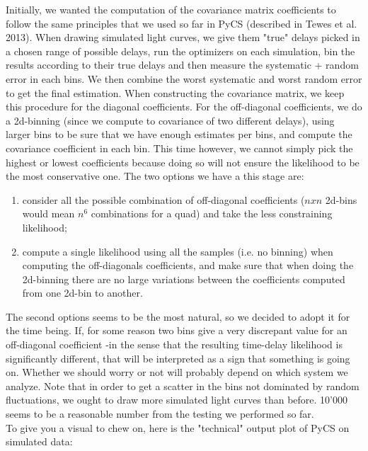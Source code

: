 \documentclass[11pt]{scrartcl}
\begin{document}
Initially, we wanted the computation of the covariance matrix 
coefficients to follow the same 
principles that we used so far in PyCS (described in Tewes et al. 
2013). When drawing simulated light curves, we give them "true" delays 
picked in a chosen range of possible delays, run the optimizers on each 
simulation, bin the results according to their true delays and then 
measure the systematic + random error in each bins. We then combine the 
worst systematic and worst random error to get the final estimation. 
When constructing the covariance matrix, we keep this procedure for the 
diagonal 
coefficients. For the off-diagonal coefficients, we do a 2d-binning 
(since we compute to covariance of two different delays), using larger 
bins to be 
sure that we have enough estimates per bins, and compute the covariance 
coefficient in each bin. This time however, we cannot simply pick the 
highest or lowest coefficients because 
doing so will not ensure the likelihood to be the most conservative 
one. The two options we have a this stage are:

\begin{enumerate}
\item consider all the possible combination of off-diagonal 
coefficients ($nxn$ 2d-bins would mean $n^6$ combinations for a quad) 
and take the less constraining likelihood; 

\item compute a single likelihood using all the samples (i.e. no 
binning) when computing the off-diagonals coefficients, and make sure 
that when doing the 2d-binning there are no large variations between the 
coefficients computed from one 2d-bin to another. 
\end{enumerate}

The second options seems to be the most natural, so we decided to adopt 
it for the time being. If, for some reason two bins give a very 
discrepant value for an off-diagonal coefficient -in the sense that the 
resulting time-delay likelihood is significantly different, that will 
be interpreted as a sign that something is going on. Whether we should 
worry or not will probably depend on which system we analyze. Note 
that in order to get a scatter in the bins not dominated by random 
fluctuations, we ought to draw more simulated light curves than before. 
10'000 seems to be a reasonable number from the testing we performed so 
far.\\

To give you a visual to chew on, here is the "technical" output plot of 
PyCS on simulated data:\\
\end{document}
